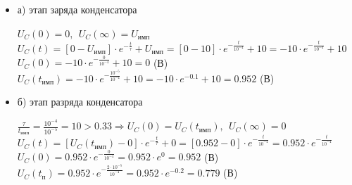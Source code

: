 		
\begin{itemize}
\item[] а) этап заряда конденсатора

		$U_C(0) = 0,\ \ U_C(\infty) = U_\text{имп}$\\	
		$U_C(t) = [0 - U_\text{имп}] \cdot e^{-\frac{t}{\tau}} + U_\text{имп} = [0 - 10] \cdot e^{-\frac{t}{10^{-4}}} + 10 = -10 \cdot e^{-\frac{t}{10^{-4}}} + 10$\\
		$U_C(0) = -10 \cdot e^{-\frac{0}{10^{-4}}} + 10 = 0$ (В)\\
		$U_C(t_\text{имп}) = -10 \cdot e^{-\frac{10^{-5}}{10^{-4}}} + 10 = -10 \cdot e^{-0.1} + 10 = 0.952$ (В)\\
		
\item[] б) этап разряда конденсатора
	
		$\frac{\tau}{t_\text{имп}} = \frac{10^{-4}}{10^{-5}} = 10 > 0.33 \Rightarrow U_C(0) = U_C(t_\text{имп}),\ \ U_C(\infty) = 0$\\
		$U_C(t) = [U_C(t_\text{имп}) - 0] \cdot e^{-\frac{t}{\tau}} + 0 =  [0.952 - 0] \cdot e^{-\frac{t}{10^{-4}}} = 0.952 \cdot e^{-\frac{t}{10^{-4}}}$\\
		$U_C(0) = 0.952 \cdot e^{-\frac{0}{10^{-4}}} = 0.952 \cdot e^0 = 0.952$ (В)\\
		$U_C(t_\text{п}) = 0.952 \cdot e^{-\frac{ 2 \cdot 10^{-5}}{10^{-4}}} = 0.952 \cdot e^{-0.2} = 0.779$ (В)\\
		
\end{itemize}				
		
